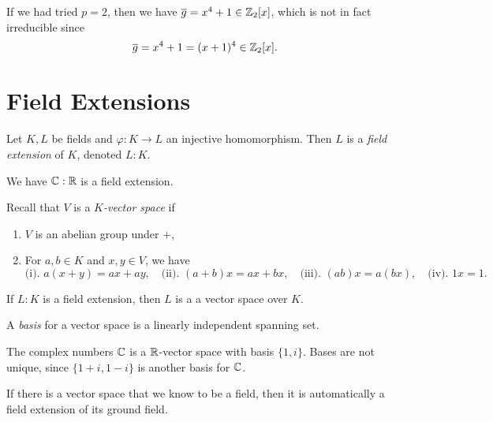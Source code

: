 \begin{remark}
  If we had tried $p = 2$, then we have
  $\overline{g} = x^4 + 1 \in \mathbb{Z}_2[x]$, which is
  not in fact irreducible since
  \[\overline{g} = x^4 + 1 = (x + 1)^4 \in \mathbb{Z}_2[x].\]
\end{remark}

\section{Field Extensions}
\begin{definition}
  Let $K, L$ be fields and $\varphi : K \to L$ an
  injective homomorphism. Then $L$ is a
  \emph{field extension} of $K$, denoted $L : K$.
\end{definition}

\begin{example}
  We have $\mathbb{C} : \mathbb{R}$ is a field extension.
\end{example}

\begin{definition}
Recall that $V$ is a \emph{$K$-vector space} if
\begin{enumerate}
  \item $V$ is an abelian group under $+$,
  \item For $a, b \in K$ and $x, y \in V$, we have
    \[\text{(i). } a(x + y) = ax + ay, \quad \text{(ii). }(a + b)x = ax + bx, \quad \text{(iii). } (ab)x = a(bx), \quad \text{(iv). } 1x = 1.\]
\end{enumerate}
\end{definition}

\begin{remark}
  If $L : K$ is a field extension, then $L$ is a
  a vector space over $K$.
\end{remark}

\begin{definition}
  A \emph{basis} for a vector space is a linearly
  independent spanning set.
\end{definition}

\begin{example}
  The complex numbers $\mathbb{C}$ is a $\mathbb{R}$-vector space
  with basis $\{1, i\}$. Bases are not unique,
  since $\{1 + i, 1 - i\}$ is another basis for $\mathbb{C}$.
\end{example}

\begin{example}
  If there is a vector space that we know to be a field,
  then it is automatically a field extension of its
  ground field.
\end{example}


